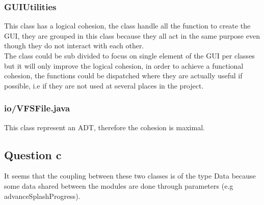 \documentclass[a4paper,10pt]{article}
\begin{document}
\subsubsection{GUIUtilities}
This class has a logical cohesion, the class handle all the function to create the GUI, they are grouped in this class because they all act in the same purpose even though they do not interact with each other.\\
The class could be sub divided to focus on single element of the GUI per classes but it will only improve the logical cohesion, in order to achieve a functional cohesion, the functions could be dispatched where they are actually useful if possible, i.e if they are not used at several places in the project.
\subsubsection{io/VFSFile.java}
This class represent an ADT, therefore the cohesion is maximal.
\subsection{Question c}
It seems that the coupling between these two classes is of the type Data because some data shared between the modules are done through parameters (e.g advanceSplashProgress).
\end{document}
